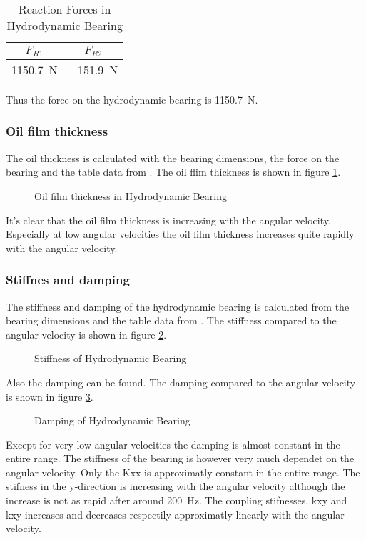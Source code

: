 \begin{table}[ht]
    \centering
    \caption{Reaction Forces in Hydrodynamic Bearing}
    \label{tab:hydrodynamic_bearing_reactions}
    \begin{tabular}{@{}cc@{}}
        \toprule
        $F_{R1}$    &   $F_{R2}$    \\ \midrule
        \SI{1150.7}{\newton}  &   \SI{-151.9}{\newton}  \\ \bottomrule
    \end{tabular}
\end{table}
Thus the force on the hydrodynamic bearing is \SI{1150.7}{\newton}.

\subsubsection{Oil film thickness}
The oil thickness is calculated with the bearing dimensions, the force on the bearing and the table data from \cite[Table 1a]{Problem}. The oil flim thickness is shown in figure \ref{fig:oil_film_thickness}.
\begin{figure}[ht]
    \centering
    
    \caption{Oil film thickness in Hydrodynamic Bearing}
    \label{fig:oil_film_thickness}
\end{figure}
It's clear that the oil film thickness is increasing with the angular velocity. Especially at low angular velocities the oil film thickness increases quite rapidly with the angular velocity.

\subsubsection{Stiffnes and damping}
The stiffness and damping of the hydrodynamic bearing is calculated from the bearing dimensions and the table data from \cite[Table 1a]{Problem}. The stiffness compared to the angular velocity is shown in figure \ref{fig:hydrodynamic_bearing_stiffness}.
\begin{figure}[ht]
    \centering
    
    \caption{Stiffness of Hydrodynamic Bearing}
    \label{fig:hydrodynamic_bearing_stiffness}
\end{figure}
Also the damping can be found. The damping compared to the angular velocity is shown in figure \ref{fig:hydrodynamic_bearing_damping}.
\begin{figure}[ht]
    \centering
    
    \caption{Damping of Hydrodynamic Bearing}
    \label{fig:hydrodynamic_bearing_damping}
\end{figure}
Except for very low angular velocities the damping is almost constant in the entire range. The stiffness of the bearing is however very much dependet on the angular velocity. Only the Kxx is approximatly constant in the entire range. The stifness in the y-direction is increasing with the angular velocity although the increase is not as rapid after around \SI{200}{\hertz}. The coupling stifnesses, kxy and kxy increases and decreases respectily approximatly linearly with the angular velocity.

